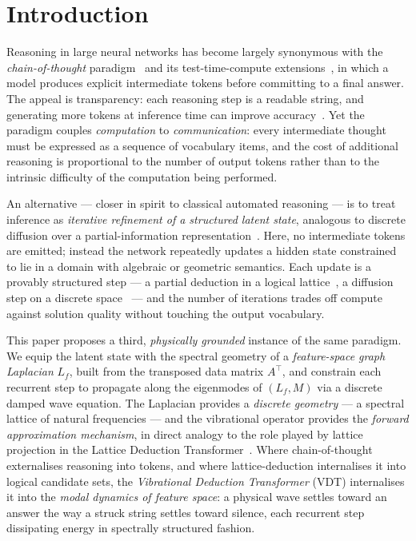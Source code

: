 \documentclass[12pt,a4paper]{article}
\theoremstyle{plain}
\theoremstyle{definition}
\theoremstyle{remark}
\newcommand{\1}{\mathbf{1}}
\newcommand{\VDT}{\textsc{VDT}}
\begin{document}
\section{Introduction}
\label{sec:intro}

Reasoning in large neural networks has become largely synonymous with
the \emph{chain-of-thought} paradigm~\cite{wei2022cot} and its
test-time-compute extensions~\cite{snell2024scaling,brown2024large},
in which a model produces explicit intermediate tokens before
committing to a final answer.
The appeal is transparency: each reasoning step is a readable string,
and generating more tokens at inference time can improve
accuracy~\cite{muennighoff2025scaling}.
Yet the paradigm couples \emph{computation} to \emph{communication}:
every intermediate thought must be expressed as a sequence of
vocabulary items, and the cost of additional reasoning is proportional
to the number of output tokens rather than to the intrinsic difficulty
of the computation being performed.

An alternative --- closer in spirit to classical automated
reasoning --- is to treat inference as \emph{iterative refinement of a
structured latent state}, analogous to discrete diffusion over a
partial-information
representation~\cite{austin2021d3pm,davis2026ldt}.
Here, no intermediate tokens are emitted; instead the network
repeatedly updates a hidden state constrained to lie in a domain with
algebraic or geometric semantics.
Each update is a provably structured step --- a partial deduction in a
logical lattice~\cite{davis2026ldt}, a diffusion step on a discrete
space~\cite{austin2021d3pm} --- and the number of iterations trades
off compute against solution quality without touching the output
vocabulary.

This paper proposes a third, \emph{physically grounded} instance of
the same paradigm.
We equip the latent state with the spectral geometry of a
\emph{feature-space graph Laplacian} $L_f$, built from the transposed
data matrix $A^\top$, and constrain each recurrent step to propagate
along the eigenmodes of $(L_f, M)$ via a discrete damped wave
equation.
The Laplacian provides a \emph{discrete geometry} --- a spectral
lattice of natural frequencies --- and the vibrational operator
provides the \emph{forward approximation mechanism}, in direct analogy
to the role played by lattice projection in the Lattice Deduction
Transformer~\cite{davis2026ldt}.
Where chain-of-thought externalises reasoning into tokens, and where
lattice-deduction internalises it into logical candidate sets, the
\emph{Vibrational Deduction Transformer} (\VDT{}) internalises it
into the \emph{modal dynamics of feature space}: a physical wave
settles toward an answer the way a struck string settles toward
silence, each recurrent step dissipating energy in spectrally
structured fashion.
\end{document}
